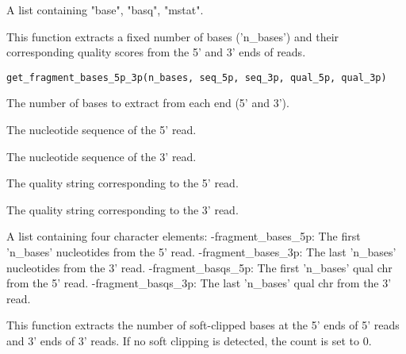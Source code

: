 \documentclass[a4paper]{book}
\begin{document}
%
\begin{Value}
A list containing "base", "basq", "mstat".
\end{Value}
%
\begin{Description}
This function extracts a fixed number of bases ('n\_bases')
and their corresponding quality scores from the 5' and 3' ends of reads.
\end{Description}
%
\begin{Usage}
\begin{verbatim}
get_fragment_bases_5p_3p(n_bases, seq_5p, seq_3p, qual_5p, qual_3p)
\end{verbatim}
\end{Usage}
%
\begin{Arguments}
\begin{ldescription}
\item[\code{n\_bases}] The number of bases to extract from each end (5' and 3').

\item[\code{seq\_5p}] The nucleotide sequence of the 5' read.

\item[\code{seq\_3p}] The nucleotide sequence of the 3' read.

\item[\code{qual\_5p}] The quality string corresponding to the 5' read.

\item[\code{qual\_3p}] The quality string corresponding to the 3' read.
\end{ldescription}
\end{Arguments}
%
\begin{Value}
A list containing four character elements:
-fragment\_bases\_5p: The first 'n\_bases' nucleotides from the 5' read.
-fragment\_bases\_3p: The last 'n\_bases' nucleotides from the 3' read.
-fragment\_basqs\_5p: The first 'n\_bases' qual chr from the 5' read.
-fragment\_basqs\_3p: The last 'n\_bases' qual chr from the 3' read.
\end{Value}
%
\begin{Description}
This function extracts the number of soft-clipped bases at the 5' ends of 5' reads and 3' ends of 3' reads.
If no soft clipping is detected, the count is set to 0.
\end{Description}
\end{document}
